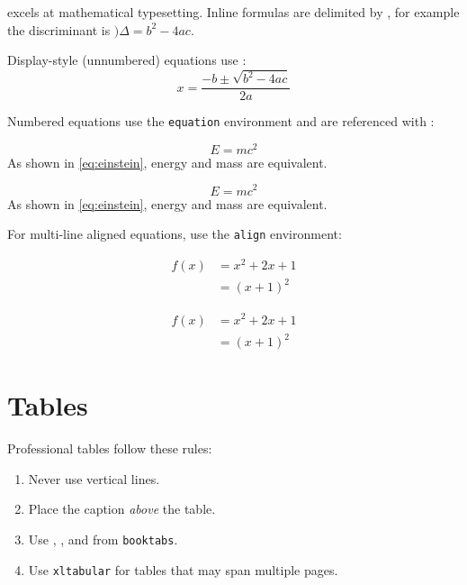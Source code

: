  excels at mathematical typesetting.
Inline formulas are delimited by , for example the discriminant is \()\Delta = b^2 - 4ac\).

Display-style (unnumbered) equations use \latexinline{\[...\]}:
\[ x = \frac{-b \pm \sqrt{b^2-4ac}}{2a} \]

Numbered equations use the \texttt{equation} environment and are referenced with \latexinline{\autoref}:
\begin{latexcode}
\begin{equation}
  E = mc^2
  \label{eq:einstein}
\end{equation}
As shown in \autoref{eq:einstein}, energy and mass are equivalent.
\end{latexcode}
\begin{equation}
  E = mc^2
  \label{eq:einstein}
\end{equation}
As shown in \autoref{eq:einstein}, energy and mass are equivalent.

For multi-line aligned equations, use the \texttt{align} environment:
\begin{latexcode}
\begin{align}
  f(x) &= x^2 + 2x + 1 \label{eq:fx}\\
       &= (x+1)^2      \label{eq:fx_factored}
\end{align}
\end{latexcode}
\begin{align}
  f(x) &= x^2 + 2x + 1 \label{eq:fx}\\
       &= (x+1)^2      \label{eq:fx_factored}
\end{align}


\section{Tables}
\label{sec:tables}

Professional tables follow these rules:
\begin{enumerate}
  \item Never use vertical lines.
  \item Place the caption \emph{above} the table.
  \item Use \latexinline{\toprule}, \latexinline{\midrule}, and \latexinline{\bottomrule} from \texttt{booktabs}.
  \item Use \texttt{xltabular} for tables that may span multiple pages.
\end{enumerate}

